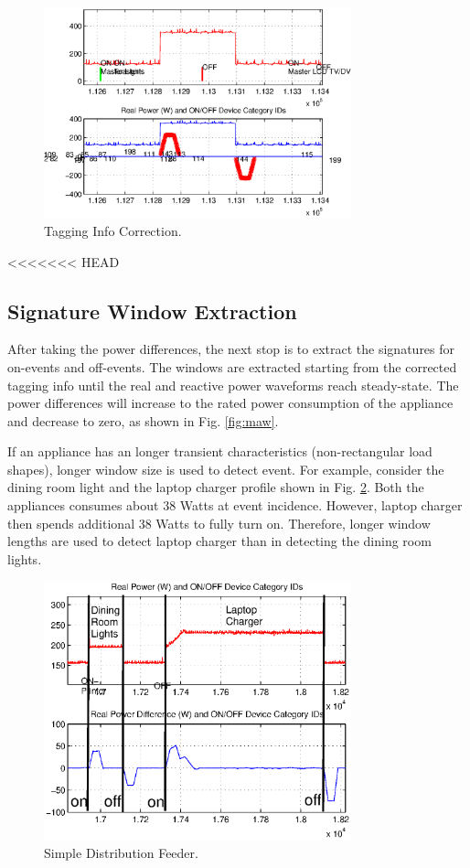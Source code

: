 \documentclass[conference]{IEEEtran}
\begin{document}
	\begin{figure}[!t]
		\centering
		\includegraphics[width=3.5in]{fig/masterlights.eps}
		\caption{Tagging Info Correction.}
		\label{fig:tagging}
	\end{figure}
	
	<<<<<<< HEAD
	\subsection{Signature Window Extraction}
	After taking the power differences, the next stop is to extract the signatures for on-events and off-events. The windows are extracted starting from the corrected tagging info until the real and reactive power waveforms reach steady-state.  The power differences will increase to the rated power consumption of the appliance and decrease to zero, as shown in Fig. \ref{fig:maw}.
	
	If an appliance has an longer transient characteristics (non-rectangular load shapes), longer window size is used to detect event.  For example, consider the dining room light and the laptop charger profile shown in Fig. \ref{fig:windowlength}.  Both the appliances consumes about 38 Watts at event incidence.  However, laptop charger then spends additional 38 Watts to fully turn on.  Therefore, longer window lengths are used to detect laptop charger than in detecting the dining room lights. 
	
	\begin{figure}[!t]
		\centering
		\includegraphics[width=3.5in]{fig/windowlength.eps}
		\caption{Simple Distribution Feeder.}
		\label{fig:windowlength}
	\end{figure}
	
\end{document}
